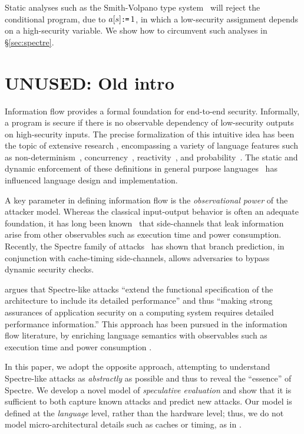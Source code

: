 \documentclass[conference]{IEEEtran}
\theoremstyle{plain}
\theoremstyle{definition}
\begin{document}
Static analyses such as the Smith-Volpano type
system~\cite{Smith:1998:SIF:268946.268975} will reject the conditional
program, due to $a[s]\texttt{:}\mkern-1mu\texttt{=}\, 1$, in which a low-security assignment depends on
a high-security variable.  We show how to circumvent such analyses in
\S\ref{sec:spectre}.

\section{UNUSED: Old intro}
Information flow provides a formal
foundation for end-to-end security.  Informally, a program is secure
if there is no observable dependency of low-security outputs on high-security inputs.
The precise formalization of this intuitive idea has been the topic of
extensive research \cite{Sabelfeld:2006:LIS:2312191.2314769}, encompassing a variety of language
features such as non-determinism~\cite{Wittbold1990InformationFI},
concurrency~\cite{Smith:1998:SIF:268946.268975}, reactivity~\cite{O'Neill:2006:ISI:1155442.1155677}, and
probability~\cite{Gray:1992:TMF:2699806.2699811}. The static and dynamic enforcement
of these definitions in general purpose languages~\cite{myers-popl99} has %
influenced language design and implementation.

A key parameter in defining information flow is the \emph{observational power} of the attacker model. Whereas the classical
input-output behavior is often an adequate foundation,
it has long been known~\cite{Lampson:1973:NCP:362375.362389,Biswas:2017:STC:3058791.3023872} that side-channels that leak
information arise from other observables such as execution time and
power consumption.
Recently, the Spectre family of attacks~\cite{DBLP:journals/corr/abs-1801-01203} has
shown that branch prediction, in conjunction with cache-timing side-channels,
allows adversaries to bypass dynamic security checks.

\citet{Chien:2018} argues that Spectre-like attacks ``extend the functional
specification of the architecture to include its detailed performance'' and
thus ``making strong assurances of application security on a computing system
requires detailed performance information.''
This approach has been pursued in the information flow literature, by
enriching language semantics with observables such as execution time and  power consumption
\cite{Zhang:2012:LCM:2345156.2254078,hyperflow}.

In this paper, we adopt the opposite approach, attempting to understand
Spectre-like attacks as \emph{abstractly} as possible and thus to reveal the
``essence'' of Spectre.  We develop a novel model of \emph{speculative
  evaluation} and show that it is sufficient to both capture known attacks and
predict new attacks.  Our model is defined at the \emph{language} level,
rather than the hardware level; thus, we do not model micro-architectural
details such as caches or timing, as in
\cite{Zhang:2012:LCM:2345156.2254078,hyperflow}.
\end{document}
